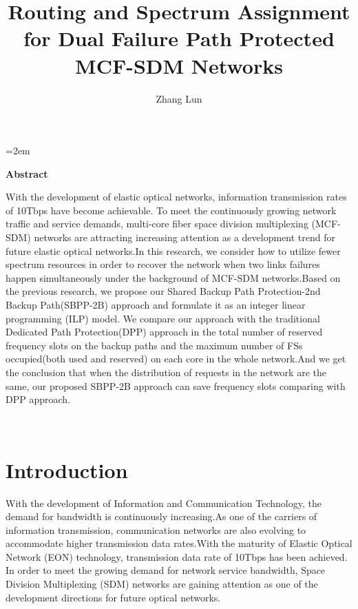 \documentclass[a4paper,11pt]{report}
\title{Routing and Spectrum Assignment for Dual Failure Path Protected MCF-SDM Networks}
\author{Zhang Lun}
\begin{document}
\maketitle
\thispagestyle{empty}
\newpage

\thispagestyle{empty}
\vspace*{20pt plus 1fil}
\parindent=2em%
\noindent
\begin{center}
{\bf Abstract}
\vspace{5mm}
\end{center}
   With the development of elastic optical networks, information transmission rates of 10Tbps have become achievable. To meet the continuously growing network traffic and service demands, multi-core fiber space division multiplexing (MCF-SDM) networks are attracting increasing attention as a development trend for future elastic optical networks.In this research, we consider how to utilize fewer spectrum resources in order to recover the network when two links failures happen simultaneously under the background of MCF-SDM networks.Based on the previous research, we propose our Shared Backup Path Protection-2nd Backup Path(SBPP-2B) approach and formulate it as an integer linear programming (ILP) model. We compare our approach with the traditional Dedicated Path Protection(DPP) approach in the total number of reserved frequency slots on the backup paths and the maximum number of FSs occupied(both used and reserved) on each core in the whole network.And we get the conclusion that when the distribution of requests in the network are the same, our proposed SBPP-2B approach can save frequency slots comparing with DPP approach.

\\

\vspace{0pt plus 1fil}
\newpage

\tableofcontents%
\listoffigures%
\listoftables

\pagebreak \setcounter{page}{1}



\chapter{Introduction}
    With the development of Information and Communication Technology, the demand for bandwidth is continuously increasing.As one of the carriers of information transmission, communication networks are also evolving to accommodate higher transmission data rates.With the maturity of Elastic Optical Network (EON) technology, transmission data rate of 10Tbps has been achieved. In order to meet the growing demand for network service bandwidth, Space Division Multiplexing (SDM) networks \cite{richardson2013} \cite{pj2018} are gaining attention as one of the development directions for future optical networks.\par
\end{document}
